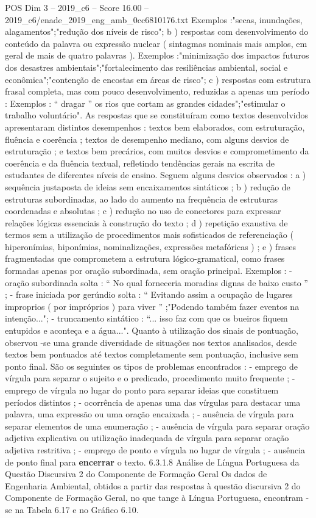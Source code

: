 \begin{textsample}{POS Dim 3 – 2019\_c6 – Score 16.00 – 2019\_c6/enade\_2019\_eng\_amb\_0cc6810176.txt}
Exemplos :"secas, inundações, alagamentos";"redução dos níveis de risco"; b ) respostas com desenvolvimento do conteúdo da palavra ou expressão nuclear ( sintagmas nominais mais amplos, em geral de mais de quatro palavras ).
Exemplos :"minimização dos impactos futuros dos desastres ambientais";"fortalecimento das resiliências ambiental, social e econômica";"contenção de encostas em áreas de risco"; c ) respostas com estrutura frasal completa, mas com pouco desenvolvimento, reduzidas a apenas um período : Exemplos : “ dragar ” os rios que cortam as grandes cidades";"estimular o trabalho voluntário".
As respostas que se constituíram como textos desenvolvidos apresentaram distintos desempenhos : textos bem elaborados, com estruturação, fluência e coerência ; textos de desempenho mediano, com alguns desvios de estruturação ; e textos bem precários, com muitos desvios e comprometimento da coerência e da fluência textual, refletindo tendências gerais na escrita de estudantes de diferentes níveis de ensino.
Seguem alguns desvios observados : a ) sequência justaposta de ideias sem encaixamentos sintáticos ; b ) redução de estruturas subordinadas, ao lado do aumento na frequência de estruturas coordenadas e absolutas ; c ) redução no uso de conectores para expressar relações lógicas essenciais à construção do texto ; d ) repetição exaustiva de termos sem a utilização de procedimentos mais sofisticados de referenciação ( hiperonímias, hiponímias, nominalizações, expressões metafóricas ) ; e ) frases fragmentadas que comprometem a estrutura lógico-gramatical, como frases formadas apenas por oração subordinada, sem oração principal.
Exemplos : - oração subordinada solta : “ No qual forneceria moradias dignas de baixo custo ” ; - frase iniciada por gerúndio solta : “ Evitando assim a ocupação de lugares improprios ( por impróprios ) para viver ” ;"Podendo também fazer eventos na intenção..."; - truncamento sintático : “... isso faz com que os bueiros fiquem entupidos e aconteça e a água...".
Quanto à utilização dos sinais de pontuação, observou -se uma grande diversidade de situações nos textos analisados, desde textos bem pontuados até textos completamente sem pontuação, inclusive sem ponto final.
São os seguintes os tipos de problemas encontrados : - emprego de vírgula para separar o sujeito e o predicado, procedimento muito frequente ; - emprego de vírgula no lugar do ponto para separar ideias que constituem períodos distintos ; - ocorrência de apenas uma das vírgulas para destacar uma palavra, uma expressão ou uma oração encaixada ; - ausência de vírgula para separar elementos de uma enumeração ; - ausência de vírgula para separar oração adjetiva explicativa ou utilização inadequada de vírgula para separar oração adjetiva restritiva ; - emprego de ponto e vírgula no lugar de vírgula ; - ausência de ponto final para \textbf{encerrar} o texto. 6.3.1.8 Análise de Língua Portuguesa da Questão Discursiva 2 do Componente de Formação Geral Os dados de Engenharia Ambiental, obtidos a partir das respostas à questão discursiva 2 do Componente de Formação Geral, no que tange à Língua Portuguesa, encontram -se na Tabela 6.17 e no Gráfico 6.10.

\end{textsample}

